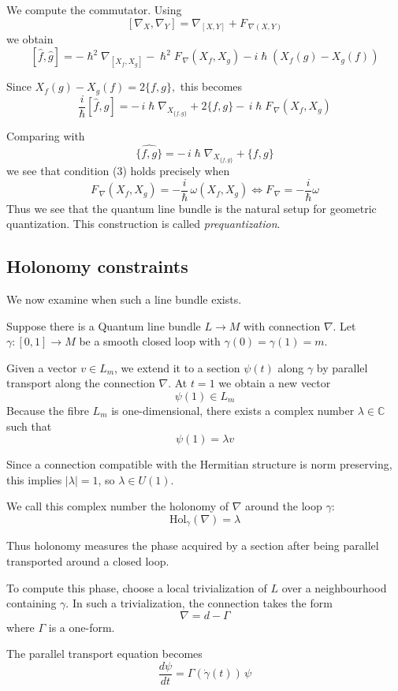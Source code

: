 \documentclass[
  12pt,
  a4paper, oneside
]{report}
\renewcommand{\hbar}{\hslash}
\theoremstyle{bolddef}
\theoremstyle{remark}
\numberwithin{equation}{chapter}
\begin{document}
We compute the commutator.
Using
$$
[\nabla_X,\nabla_Y]
=
\nabla_{[X,Y]} + F_{\,\nabla(X,Y)}
$$
we obtain
$$
[\hat f,\hat g]
=
-\hbar^{2}\nabla_{[X_f,X_g]}
- \hbar^{2} F_{\,\nabla}(X_f,X_g)
-i \hbar(X_f(g)-X_g(f))
$$

Since $X_f(g)-X_g(f) = 2\{f,g\},$ this becomes
$$
\frac{i}{\hbar}[\hat f,\hat g]
=
-\, i \hbar \nabla_{X_{\{f,g\}}}
 + 2\{f,g\}
 -\, i \hbar F_{\,\nabla}(X_f,X_g)
$$

Comparing with
$$
\widehat{\{f,g\}}
=
-\, i \hbar \nabla_{X_{\{f,g\}}}
+
\{f,g\}
$$
we see that condition (3) holds precisely when
$$
  F_{\,\nabla}(X_f,X_g)
=
-\frac{i}{\hbar}\, \omega(X_f,X_g) \iff F_{\,\nabla} = -\frac{i}{\hbar}\omega
$$
Thus we see that the quantum line bundle is the natural setup for geometric quantization. This construction is called \emph{prequantization}\cite{Woodhouse1997}.

\bigskip

\subsection{Holonomy constraints}

We now examine when such a line bundle exists.

Suppose there is a Quantum line bundle
$L \to M$ with connection $\nabla$. Let $\gamma:[0,1]\to M$ be a smooth closed loop with
$\gamma(0)=\gamma(1)=m$.

Given a vector $v\in L_m$, we extend it to a section
$\psi(t)$ along $\gamma$ by parallel transport along the connection $\nabla$.
At $t=1$ we obtain a new vector
$$
\psi(1)\in L_m
$$
Because the fibre $L_m$ is one-dimensional,
there exists a complex number $\lambda\in\mathbb C$
such that
$$
\psi(1)=\lambda v
$$

Since a connection compatible with the Hermitian structure is norm preserving, this implies $|\lambda|=1$,
so $\lambda\in U(1)$.

We call this complex number the holonomy of $\nabla$
around the loop $\gamma$:
$$
\mathrm{Hol}_\gamma(\nabla)=\lambda
$$

Thus holonomy measures the phase acquired by a section
after being parallel transported around a closed loop.

To compute this phase, choose a local trivialization of $L$
over a neighbourhood containing $\gamma$.
In such a trivialization, the connection takes the form
$$
\nabla = d - \Gamma
$$
where $\Gamma$ is a one-form.

The parallel transport equation becomes
$$
\frac{d\psi}{dt}
=
\Gamma(\dot\gamma(t))\,\psi
$$
\end{document}
